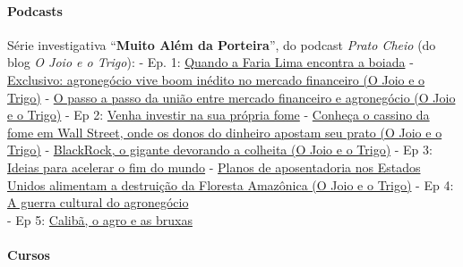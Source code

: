 \hypertarget{podcasts}{%
\paragraph{Podcasts}\label{podcasts}}

Série investigativa ``\textbf{Muito Além da Porteira}'', do podcast
\textit{Prato Cheio} (do blog \textit{O Joio e o Trigo}): - Ep. 1:
\href{https://ojoioeotrigo.com.br/2021/11/quando-a-faria-lima-encontra-a-boiada/}{Quando
a Faria Lima encontra a boiada} -
\href{https://ojoioeotrigo.com.br/2021/11/agronegocio-boom-inedito-mercado-financeiro/}{Exclusivo:
agronegócio vive boom inédito no mercado financeiro (O Joio e o Trigo)}
-
\href{https://ojoioeotrigo.com.br/2021/11/mercado-financeiro-e-agronegocio/}{O
passo a passo da união entre mercado financeiro e agronegócio (O Joio e
o Trigo)} - Ep 2:
\href{https://ojoioeotrigo.com.br/2021/11/venha-investir-na-sua-propria-fome/}{Venha
investir na sua própria fome} -
\href{https://ojoioeotrigo.com.br/2021/11/conheca-o-cassino-da-fome-em-wall-street-onde-os-donos-do-dinheiro-apostam-seu-prato/}{Conheça
o cassino da fome em Wall Street, onde os donos do dinheiro apostam seu
prato (O Joio e o Trigo)} -
\href{https://ojoioeotrigo.com.br/2021/11/blackrock-o-gigante-devorando-a-colheita/}{BlackRock,
o gigante devorando a colheita (O Joio e o Trigo)} - Ep 3:
\href{https://ojoioeotrigo.com.br/2022/01/ideias-para-acelerar-o-fim-do-mundo/}{Ideias
para acelerar o fim do mundo} -
\href{https://ojoioeotrigo.com.br/2021/11/planos-de-aposentadoria-nos-estados-unidos-alimentam-a-destruicao-da-floresta-amazonica/}{Planos
de aposentadoria nos Estados Unidos alimentam a destruição da Floresta
Amazônica (O Joio e o Trigo)} - Ep 4:
\href{https://ojoioeotrigo.com.br/2022/01/a-guerra-cultural-do-agronegocio/}{A
guerra cultural do agronegócio}\\
- Ep 5:
\href{https://ojoioeotrigo.com.br/2022/02/a-guerra-cultural-do-agronegocio-2/}{Calibã,
o agro e as bruxas}

\hypertarget{cursos}{%
\paragraph{Cursos}\label{cursos}}

